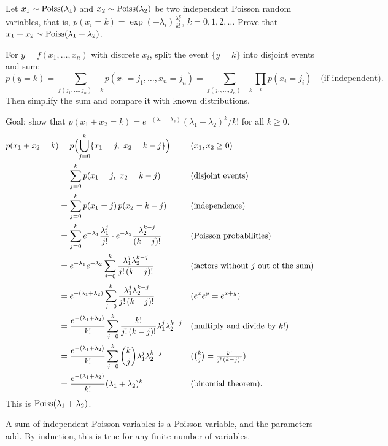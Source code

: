 Let $x_1 \sim \operatorname{Poiss}(\lambda_1)$ and $x_2 \sim \operatorname{Poiss}(\lambda_2)$ be two
independent Poisson random variables, that is,
$p(x_i = k) = \exp(-\lambda_i) \frac{\lambda_i^k}{k!}$,
$k = 0, 1, 2, \ldots$ Prove that
$x_1 + x_2 \sim \operatorname{Poiss}(\lambda_1 + \lambda_2)$.

\begin{solution}
For $y = f(x_1, \ldots, x_n)$ with discrete $x_i$, split the event
$\{y = k\}$ into disjoint events and sum:
\[
  p(y = k)
  = \sum_{f(j_1, \ldots, j_n) = k} p(x_1 = j_1, \ldots, x_n = j_n)
  = \sum_{f(j_1, \ldots, j_n) = k} \prod_{i} p(x_i = j_i)
  \quad \text{(if independent)}.
\]
Then simplify the sum and compare it with known distributions.

Goal: show that $p(x_1 + x_2 = k) = e^{-(\lambda_1 + \lambda_2)}
(\lambda_1 + \lambda_2)^k / k!$ for all $k \geq 0$.
\begin{align*}
  p(x_1 + x_2 = k)
  &= p\Bigl(\bigcup_{j=0}^{k} \{x_1 = j, \ x_2 = k - j\}\Bigr)
    && \text{($x_1, x_2 \geq 0$)} \\
  &= \sum_{j=0}^{k} p(x_1 = j, \ x_2 = k - j)
    && \text{(disjoint events)} \\
  &= \sum_{j=0}^{k} p(x_1 = j) \, p(x_2 = k - j)
    && \text{(independence)} \\
  &= \sum_{j=0}^{k} e^{-\lambda_1} \frac{\lambda_1^j}{j!} \cdot
     e^{-\lambda_2} \frac{\lambda_2^{k-j}}{(k-j)!}
    && \text{(Poisson probabilities)} \\
  &= e^{-\lambda_1} e^{-\lambda_2}
     \sum_{j=0}^{k} \frac{\lambda_1^j \lambda_2^{k-j}}{j! \, (k-j)!}
    && \text{(factors without $j$ out of the sum)} \\
  &= e^{-(\lambda_1 + \lambda_2)}
     \sum_{j=0}^{k} \frac{\lambda_1^j \lambda_2^{k-j}}{j! \, (k-j)!}
    && \text{($e^{x} e^{y} = e^{x + y}$)} \\
  &= \frac{e^{-(\lambda_1 + \lambda_2)}}{k!}
     \sum_{j=0}^{k} \frac{k!}{j! \, (k-j)!} \lambda_1^j \lambda_2^{k-j}
    && \text{(multiply and divide by $k!$)} \\
  &= \frac{e^{-(\lambda_1 + \lambda_2)}}{k!}
     \sum_{j=0}^{k} \binom{k}{j} \lambda_1^j \lambda_2^{k-j}
    && \textstyle\text{($\binom{k}{j} = \frac{k!}{j! \, (k-j)!}$)} \\
  &= \frac{e^{-(\lambda_1 + \lambda_2)}}{k!} (\lambda_1 + \lambda_2)^k
    && \text{(binomial theorem)}.
\end{align*}
This is $\operatorname{Poiss}(\lambda_1 + \lambda_2)$.

A sum of independent Poisson variables is a Poisson variable, and the
parameters add. By induction, this is true for any finite number of
variables.
\end{solution}
